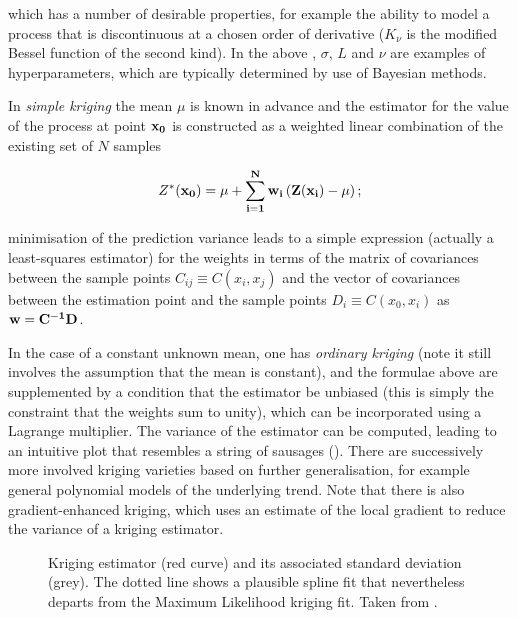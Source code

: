 which has a number of desirable properties, for example the ability to model a process that is 
discontinuous at a chosen order of derivative ($K_{\nu}$ is the modified Bessel function of the 
second kind). In the above , $\sigma$, $L$ and $\nu$ are examples of
hyperparameters, which are typically determined by use of Bayesian methods.

In {\it simple kriging} the mean $\mu$ is known in advance and the estimator for the value of the 
process at point $\bf{x}_0$ is constructed as a weighted linear combination of the existing set of $N$ 
samples

\begin{equation}
Z^*(\bf{x}_0) = \mu + \sum_{i=1}^N w_i \left ( Z(\bf{x}_i) - \mu \right );
\end{equation}

minimisation of the prediction variance leads to a simple expression (actually a least-squares 
estimator) for the weights in terms of the matrix of covariances between the sample points $C_{ij} 
\equiv C(x_i,x_j)$ and the vector of covariances between the estimation point and the sample points 
$D_i \equiv C(x_0, x_i)$ as $\bf{w} =  C^{-1} D$.

In the case of a constant unknown mean, one has {\it ordinary kriging} (note it still involves the 
assumption that the mean is constant), and the formulae above are supplemented by a condition that 
the estimator be unbiased (this is simply the constraint that the weights sum to unity), which can 
be incorporated using a Lagrange multiplier.  
The variance of the estimator can be computed, leading to an intuitive plot that resembles a string 
of sausages ().  
There are successively more involved kriging varieties based on further generalisation, for example 
general polynomial models of the underlying trend.  
Note that there is also gradient-enhanced kriging, which uses an estimate of the local gradient to 
reduce the variance of a kriging estimator.

\begin{figure}
\centerline{}
\caption{\label{fig:kriging}
Kriging estimator (red curve) and its associated standard deviation (grey).  
The dotted line shows a plausible spline fit that nevertheless departs from the Maximum 
Likelihood kriging fit.  Taken from \cite{krigingwiki}.}
\end{figure}

